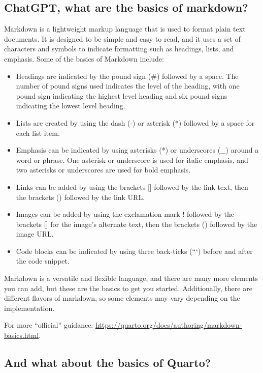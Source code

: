 \documentclass[
  12pt]{iopart}
\begin{document}
\subsection{ChatGPT, what are the basics of
markdown?}\label{chatgpt-what-are-the-basics-of-markdown}

Markdown is a lightweight markup language that is used to format plain
text documents. It is designed to be simple and easy to read, and it
uses a set of characters and symbols to indicate formatting such as
headings, lists, and emphasis. Some of the basics of Markdown include:

\begin{itemize}
\item
  Headings are indicated by the pound sign (\#) followed by a space. The
  number of pound signs used indicates the level of the heading, with
  one pound sign indicating the highest level heading and six pound
  signs indicating the lowest level heading.
\item
  Lists are created by using the dash (-) or asterisk (*) followed by a
  space for each list item.
\item
  Emphasis can be indicated by using asterisks (*) or underscores (\_)
  around a word or phrase. One asterisk or underscore is used for italic
  emphasis, and two asterisks or underscores are used for bold emphasis.
\item
  Links can be added by using the brackets {[}{]} followed by the link
  text, then the brackets () followed by the link URL.
\item
  Images can be added by using the exclamation mark ! followed by the
  brackets {[}{]} for the image's alternate text, then the brackets ()
  followed by the image URL.
\item
  Code blocks can be indicated by using three back-ticks (```) before
  and after the code snippet.
\end{itemize}

Markdown is a versatile and flexible language, and there are many more
elements you can add, but these are the basics to get you started.
Additionally, there are different flavors of markdown, so some elements
may vary depending on the implementation.

For more ``official'' guidance:
\url{https://quarto.org/docs/authoring/markdown-basics.html}.

\subsection{And what about the basics of
Quarto?}\label{sec-quarto-basics}
\end{document}
